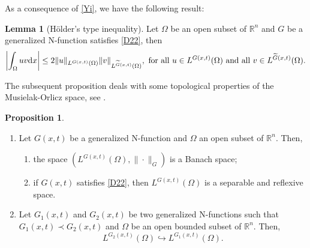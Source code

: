 \documentclass[10pt,reqno]{amsart}
\newcommand *\w{^\wedge}
\theoremstyle{definition}
\newtheorem{lemma}[theorem]{Lemma}
\newtheorem{proposition}[theorem]{Proposition}
\numberwithin{equation}{section}
\begin{document}
As a consequence of \eqref{Yi}, we have the following result:
\begin{lemma}[H\"older's type
inequality]\label{H1}
  Let $\Omega$ be an open subset of $\mathbb{R}^n$ and $G$ be a generalized \textnormal{N}-function satisfies \eqref{D22}, then
  \begin{equation}\label{Ho}
     \left\vert \int_{\Omega} uv {\rm d}x \right\vert \leq 2 \Vert u\Vert_{L^{G(x,t)}(\Omega)}\Vert v\Vert_{L^{\widetilde{G}(x,t)}(\Omega)},\ \text{for all}\ u\in L^{G(x,t)}(\Omega)\ \text{and all}\ v\in L^{\widetilde{G}(x,t)}(\Omega).
  \end{equation}
\end{lemma}
The subsequent proposition deals with some topological properties of
the Musielak-Orlicz space, see \cite[Theorem 7.7 and Theorem
8.5]{Musielak1983}.
\begin{proposition}\label{AB}\ \\
\begin{enumerate}
\item [(1)] Let $G(x,t)$ be a generalized \textnormal{N}-function and $\Omega$ an open subset of
 $\mathbb{R}^n$. Then,
 \begin{enumerate}
     \item[(a)] the space
    $\left(L^{G(x,t)}(\Omega),\|\cdot\|_{G}\right)$ is a Banach space;
     \item[(b)] if $G(x,t)$ satisfies \eqref{D22}, then
$L^{G(x,t)}(\Omega)$ is a separable and reflexive space.
 \end{enumerate}
\item [(2)] Let $G_1(x,t)$ and $G_2(x,t)$  be two generalized \textnormal{N}-functions such that $G_1(x,t) \prec G_2(x,t)$ and $\Omega$ be an open bounded subset of $\mathbb{R}^n$. Then,
$$
L^{G_2(x,t)}(\Omega) \hookrightarrow L^{G_1(x,t)}(\Omega).
$$
\end{enumerate}
\end{proposition}
\end{document}
